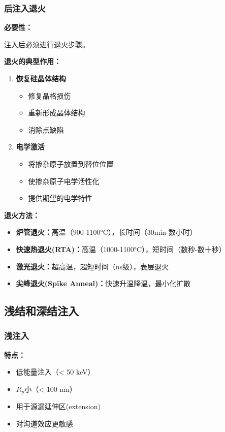 \documentclass[UTF8,12pt,a4paper]{ctexart}
\begin{document}
\subsubsection{后注入退火}

\textbf{必要性：}

注入后必须进行退火步骤。

\textbf{退火的典型作用：}

\begin{enumerate}
    \item \textbf{恢复硅晶体结构}
    \begin{itemize}
        \item 修复晶格损伤
        \item 重新形成晶体结构
        \item 消除点缺陷
    \end{itemize}
    
    \item \textbf{电学激活}
    \begin{itemize}
        \item 将掺杂原子放置到替位位置
        \item 使掺杂原子电学活性化
        \item 提供期望的电学特性
    \end{itemize}
\end{enumerate}

\textbf{退火方法：}
\begin{itemize}
    \item \textbf{炉管退火：}高温（900-1100°C），长时间（30min-数小时）
    \item \textbf{快速热退火(RTA)：}高温（1000-1100°C），短时间（数秒-数十秒）
    \item \textbf{激光退火：}超高温，超短时间（ns级），表层退火
    \item \textbf{尖峰退火(Spike Anneal)：}快速升温降温，最小化扩散
\end{itemize}

\subsection{浅结和深结注入}

\subsubsection{浅注入}

\textbf{特点：}
\begin{itemize}
    \item 低能量注入（< 50 keV）
    \item $R_p$小（< 100 nm）
    \item 用于源漏延伸区(extension)
    \item 对沟道效应更敏感
\end{itemize}
\end{document}
